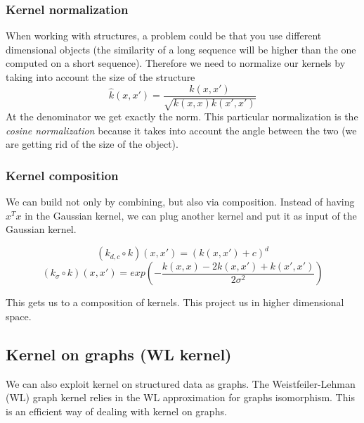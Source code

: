 \subsubsection{Kernel normalization}
When working with structures, a problem could be that you use different dimensional
objects (the similarity of a long sequence will be higher than the one computed
on a short sequence). Therefore we need to normalize our kernels by taking into
account the size of the structure
\[
	\hat{k}(x,x') = \frac{k(x,x')}{\sqrt{k(x,x)k(x',x')}}
\]
At the denominator we get exactly the norm. This particular normalization is the
\textit{cosine normalization} because it takes into account the angle between
the two (we are getting rid of the size of the object).

\subsubsection{Kernel composition}
We can build not only by combining, but also via composition. Instead of having
$x^{T}x$ in the Gaussian kernel, we can plug another kernel and put it as input of
the Gaussian kernel.

\[
	(k_{d,c}\circ k)(x,x') = (k(x,x')+c)^{d}
\]
\[
	(k_{\sigma}\circ k)(x,x') = exp\left({-\frac{k(x,x)-2k(x,x')+k(x',x')}{2\sigma^{2}}}
	\right)
\]

This gets us to a composition of kernels. This project us in higher dimensional space.

\subsection{Kernel on graphs (WL kernel)}
We can also exploit kernel on structured data as graphs. The Weistfeiler-Lehman
(WL) graph kernel relies in the WL approximation for graphs isomorphism. This is
an efficient way of dealing with kernel on graphs.


